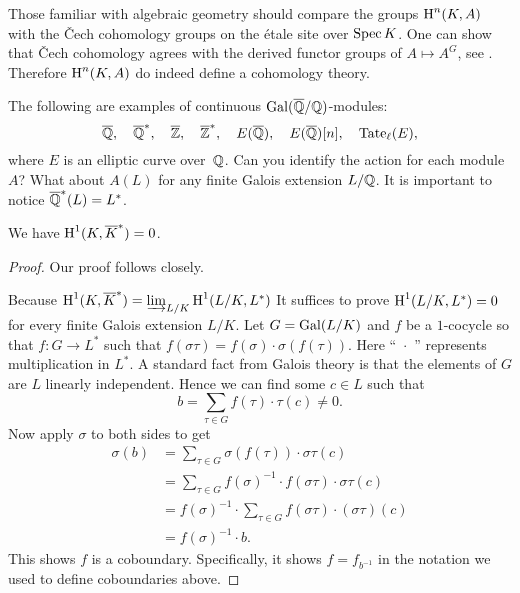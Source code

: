 \begin{remark}
	Those familiar with algebraic geometry should
	compare the groups $\operatorname{H}^n(K,A)$ with the \v{C}ech
	cohomology groups on the \'{e}tale site over $\operatorname{Spec} K$.
	One can show that \v{C}ech cohomology
	agrees with the derived functor groups of
	$A\mapsto A^G$, see \cite[Ch.~10]{milne:etale}.
	Therefore $\operatorname{H}^n(K,A)$ do indeed define a cohomology
	theory.
\end{remark}

\begin{example}
The following are examples of continuous $\operatorname{Gal}(\overline{\mathbb{Q}}/\mathbb{Q})$-modules:
$$
	\overline{\mathbb{Q}},
	\quad \overline{\mathbb{Q}}^*,
	\quad \overline{\mathbb{Z}},
	\quad \overline{\mathbb{Z}}^*,
	\quad E(\overline{\mathbb{Q}}),
	\quad E(\overline{\mathbb{Q}})[n],
	\quad {\rm Tate}_{\ell}(E),
$$
where $E$ is an elliptic curve over~$\mathbb{Q}$. Can you identify the
action for each module $A$? What about $A(L)$ for any finite
Galois extension $L/\mathbb{Q}$. It is important to notice
$\overline{\mathbb{Q}}^*(L) = L^*$.
\end{example}

\begin{theorem}[Hilbert 90]\label{thm:h90}
	We have $\operatorname{H}^1(K,\overline{K}^*) = 0$.
\end{theorem}
\begin{proof}
	Our proof follows \cite[Pg.~150]{serre:localfields} closely.
	
	Because $\operatorname{H}^1(K,\overline{K}^*) = \varinjlim_{L/K} \operatorname{H}^1(L/K,L^*)$
	It suffices to prove $\operatorname{H}^1(L/K,L^*) = 0$ for every finite
	Galois extension $L/K$.
	Let $G = \operatorname{Gal}(L/K)$ and $f$ be a $1$-cocycle so that $f:G \to L^*$
	such that $f(\sigma\tau) = f(\sigma)\cdot\sigma(f(\tau))$. Here
	``~$\cdot$~'' represents multiplication in $L^*$.
	A standard fact from Galois theory is that the elements of
	$G$ are $L$ linearly independent. Hence we can find
	some $c\in L$ such that
	$$
	b = \sum_{\tau\in G} f(\tau)\cdot\tau(c) \neq 0.
	$$
	Now apply $\sigma$ to both sides to get
	\begin{align*}
		\sigma(b)
		&=
		\sum_{\tau\in G} \sigma(f(\tau)) \cdot \sigma\tau(c)
		\\
		&=
		\sum_{\tau\in G} f(\sigma)^{-1} \cdot f(\sigma\tau)
		\cdot \sigma\tau(c)
		\\
		&=
		f(\sigma)^{-1} \cdot \sum_{\tau\in G} f(\sigma\tau)
		\cdot (\sigma\tau)(c)
		\\
		&=
		f(\sigma)^{-1}\cdot b.
	\end{align*}
	This shows $f$ is a coboundary. Specifically, it shows
	$f = f_{b^{-1}}$ in the notation we used to define
	coboundaries above.
\end{proof}

